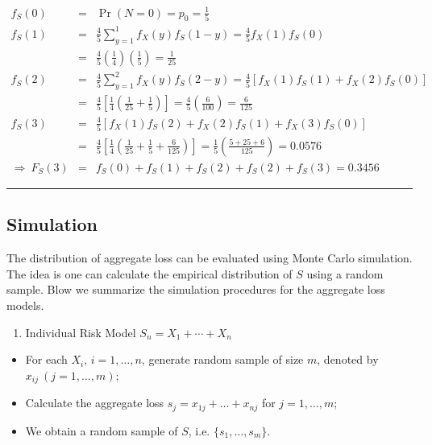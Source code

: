 \documentclass[]{book}
\providecommand{\tightlist}{%
  \setlength{\itemsep}{0pt}\setlength{\parskip}{0pt}}
\theoremstyle{definition}
\theoremstyle{definition}
\theoremstyle{definition}
\theoremstyle{remark}
\begin{document}
\begin{eqnarray*}
f_S (0) &=& \Pr(N=0) = p_0=\frac{1}{5}\\
f_S (1) &=& \frac{4}{5}\sum_{y=1}^{1} f_X (y) f_S (1-y) = \frac{4}{5} f_X(1) f_S(0)\\
&=& \frac{4}{5}\left( \frac{1}{4}\right)\left(\frac{1}{5} \right) = \frac{1}{25}\\
f_S (2) &=&  \frac{4}{5}\sum_{y=1}^{2} f_X (y) f_S (2-y) = \frac{4}{5} \left[ f_X(1)f_S(1) + f_X(2) f_S(0) \right] \\
&=& \frac{4}{5}\left[ \frac{1}{4} \left( \frac{1}{25} + \frac{1}{5}\right) \right] =
\frac{4}{5}\left( \frac{6}{100}\right) = \frac{6}{125}\\
f_S (3) &=& \frac{4}{5} \left[ f_X(1) f_S(2) + f_X(2)f_S(1) + f_X(3) f_S(0) \right]\\
&=& \frac{4}{5}\left[ \frac{1}{4} \left( \frac{1}{25} + \frac{1}{5} +
\frac{6}{125}\right) \right] = \frac{1}{5}\left( \frac{5+25+6}{125}\right) = 0.0576\\
\Rightarrow \ F_S (3) &=& f_S (0)+f_S (1)+f_S (2)+f_S (2)+f_S (3) = 0.3456
\end{eqnarray*}

\begin{center}\rule{0.5\linewidth}{\linethickness}\end{center}

\subsection{Simulation}\label{simulation}

The distribution of aggregate loss can be evaluated using Monte Carlo
simulation. The idea is one can calculate the empirical distribution of
\(S\) using a random sample. Blow we summarize the simulation procedures
for the aggregate loss models.

\begin{enumerate}
\def\labelenumi{\arabic{enumi}.}
\tightlist
\item
  Individual Risk Model \(S_n=X_1+\cdots+X_n\)
\end{enumerate}

\begin{itemize}
\item
  For each \(X_i\), \(i=1,\ldots,n\), generate random sample of size
  \(m\), denoted by \(x_{ij}~(j=1,\ldots,m)\);
\item
  Calculate the aggregate loss \(s_j=x_{1j}+\ldots+x_{nj}\) for
  \(j=1,\ldots,m\);
\item
  We obtain a random sample of \(S\), i.e. \(\{s_1,\ldots,s_m\}\).
\end{itemize}
\end{document}
